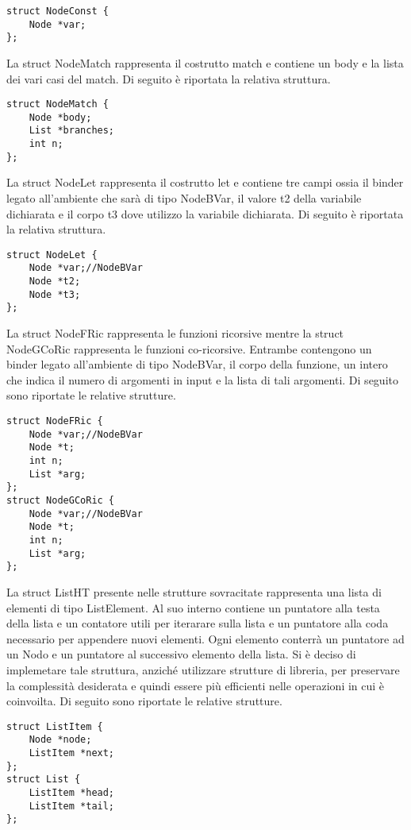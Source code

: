 \documentclass[12pt,a4paper,openright,twoside]{report}
\begin{document}
\begin{verbatim}
struct NodeConst {
    Node *var;
};
\end{verbatim}

La struct NodeMatch rappresenta il costrutto match e contiene un body e la lista dei vari casi del match. Di seguito \`e riportata la relativa struttura.

\begin{verbatim}
struct NodeMatch {
    Node *body;
    List *branches;
    int n;
};
\end{verbatim}

La struct NodeLet rappresenta il costrutto let e contiene tre campi ossia il binder legato all'ambiente che sar\`a di tipo NodeBVar, il valore t2 della variabile dichiarata e il corpo t3 dove utilizzo la variabile dichiarata. Di seguito \`e riportata la relativa struttura.

\begin{verbatim}
struct NodeLet {
    Node *var;//NodeBVar
    Node *t2;
    Node *t3;
};
\end{verbatim}

La struct NodeFRic rappresenta le funzioni ricorsive mentre la struct NodeGCoRic rappresenta le funzioni co-ricorsive. Entrambe contengono un binder legato all'ambiente di tipo NodeBVar, il corpo della funzione, un intero che indica il numero di argomenti in input e la lista di tali argomenti. Di seguito sono riportate le relative strutture.

\begin{verbatim}
struct NodeFRic {
    Node *var;//NodeBVar
    Node *t;
    int n;
    List *arg;
};
struct NodeGCoRic {
    Node *var;//NodeBVar
    Node *t;
    int n;
    List *arg;
};
\end{verbatim}

La struct ListHT presente nelle strutture sovracitate rappresenta una lista di elementi di tipo ListElement. Al suo interno contiene un puntatore alla testa della lista e un contatore utili per iterarare sulla lista e un puntatore alla coda necessario per appendere nuovi elementi. Ogni elemento conterr\`a un puntatore ad un Nodo e un puntatore al successivo elemento della lista.\newline
Si \`e deciso di implemetare tale struttura, anzich\'e utilizzare strutture di libreria, per preservare la complessit\`a desiderata e quindi essere pi\`u efficienti nelle operazioni in cui \`e coinvoilta. Di seguito sono riportate le relative strutture.
\begin{verbatim}
struct ListItem {
    Node *node;
    ListItem *next;
};
struct List {
    ListItem *head;
    ListItem *tail;
};
\end{verbatim}
\end{document}
